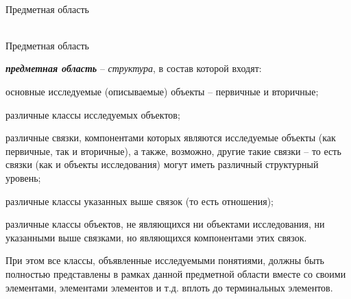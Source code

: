 \begin{frame}{\\Предметная область}
	\topline
	\justifying
	\begin{SCn}
	\end{SCn}
\end{frame}

\begin{frame}{\\Предметная область}
	\topline
	\justifying
	\\
	\footnotesize{
		\textbf{\textit{предметная область}} -- \textit{структура}, в состав которой входят:
		\begin{textitemize}
			\item{\textnormal{основные исследуемые (описываемые) объекты -- первичные и вторичные;}}
			\item{\textnormal{различные классы исследуемых объектов;}}
			\item{\textnormal{различные связки, компонентами которых являются исследуемые объекты (как первичные, так и вторичные), а также, возможно, другие такие связки -- то есть связки (как и объекты исследования) могут иметь различный структурный уровень;}}
			\item{\textnormal{различные классы указанных выше связок (то есть отношения);}}
			\item{\textnormal{различные классы объектов, не являющихся ни объектами исследования, ни указанными выше связками, но являющихся компонентами этих связок.}}
		\end{textitemize}
		При этом все классы, объявленные исследуемыми понятиями, должны быть полностью представлены в рамках данной предметной области вместе со своими элементами, элементами элементов и т.д. вплоть до терминальных элементов.
	}
\end{frame}

